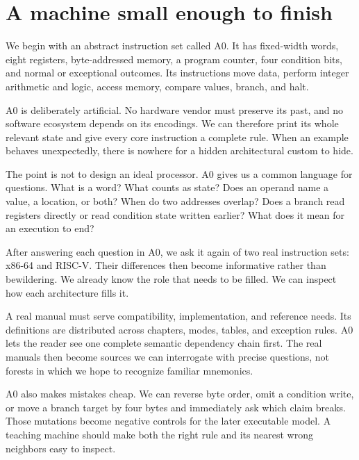 \section{A machine small enough to finish}

We begin with an abstract instruction set called A0. It has fixed-width words,
eight registers, byte-addressed memory, a program counter, four condition
bits, and normal or exceptional outcomes. Its instructions move data, perform
integer arithmetic and logic, access memory, compare values, branch, and halt.

A0 is deliberately artificial. No hardware vendor must preserve its past, and
no software ecosystem depends on its encodings. We can therefore print its
whole relevant state and give every core instruction a complete rule. When an
example behaves unexpectedly, there is nowhere for a hidden architectural
custom to hide.

The point is not to design an ideal processor. A0 gives us a common language
for questions. What is a word? What counts as state? Does an operand name a
value, a location, or both? When do two addresses overlap? Does a branch read
registers directly or read condition state written earlier? What does it mean
for an execution to end?

After answering each question in A0, we ask it again of two real instruction
sets: x86-64 and RISC-V. Their differences then become informative rather than
bewildering. We already know the role that needs to be filled. We can inspect
how each architecture fills it.

\begin{sidebar}[title={Why invent A0 instead of starting with a real manual?}]
A real manual must serve compatibility, implementation, and reference needs.
Its definitions are distributed across chapters, modes, tables, and exception
rules. A0 lets the reader see one complete semantic dependency chain first.
The real manuals then become sources we can interrogate with precise
questions, not forests in which we hope to recognize familiar mnemonics.
\end{sidebar}

A0 also makes mistakes cheap. We can reverse byte order, omit a condition
write, or move a branch target by four bytes and immediately ask which claim
breaks. Those mutations become negative controls for the later executable
model. A teaching machine should make both the right rule and its nearest
wrong neighbors easy to inspect.

